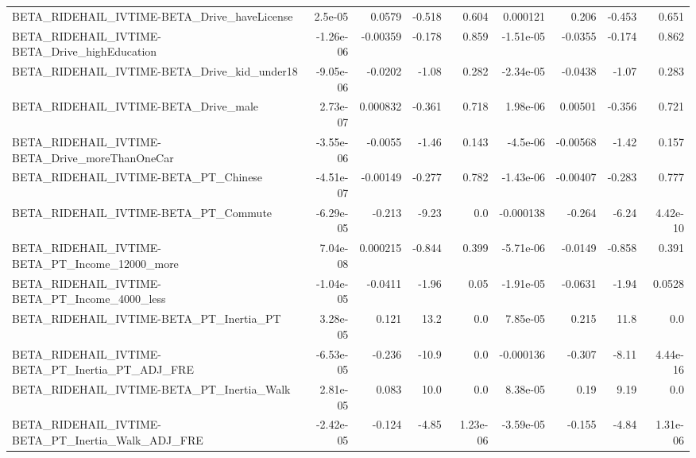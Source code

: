 \begin{tabular}{lrrrrrrrr}
BETA\_RIDEHAIL\_IVTIME-BETA\_Drive\_haveLicense        &     2.5e-05 &       0.0579 &   -0.518 &    0.604 &   0.000121 &       0.206 &       -0.453 &         0.651 \\
BETA\_RIDEHAIL\_IVTIME-BETA\_Drive\_highEducation      &   -1.26e-06 &     -0.00359 &   -0.178 &    0.859 &  -1.51e-05 &     -0.0355 &       -0.174 &         0.862 \\
BETA\_RIDEHAIL\_IVTIME-BETA\_Drive\_kid\_under18        &   -9.05e-06 &      -0.0202 &    -1.08 &    0.282 &  -2.34e-05 &     -0.0438 &        -1.07 &         0.283 \\
BETA\_RIDEHAIL\_IVTIME-BETA\_Drive\_male               &    2.73e-07 &     0.000832 &   -0.361 &    0.718 &   1.98e-06 &     0.00501 &       -0.356 &         0.721 \\
BETA\_RIDEHAIL\_IVTIME-BETA\_Drive\_moreThanOneCar     &   -3.55e-06 &      -0.0055 &    -1.46 &    0.143 &   -4.5e-06 &    -0.00568 &        -1.42 &         0.157 \\
BETA\_RIDEHAIL\_IVTIME-BETA\_PT\_Chinese               &   -4.51e-07 &     -0.00149 &   -0.277 &    0.782 &  -1.43e-06 &    -0.00407 &       -0.283 &         0.777 \\
BETA\_RIDEHAIL\_IVTIME-BETA\_PT\_Commute               &   -6.29e-05 &       -0.213 &    -9.23 &      0.0 &  -0.000138 &      -0.264 &        -6.24 &      4.42e-10 \\
BETA\_RIDEHAIL\_IVTIME-BETA\_PT\_Income\_12000\_more     &    7.04e-08 &     0.000215 &   -0.844 &    0.399 &  -5.71e-06 &     -0.0149 &       -0.858 &         0.391 \\
BETA\_RIDEHAIL\_IVTIME-BETA\_PT\_Income\_4000\_less      &   -1.04e-05 &      -0.0411 &    -1.96 &     0.05 &  -1.91e-05 &     -0.0631 &        -1.94 &        0.0528 \\
BETA\_RIDEHAIL\_IVTIME-BETA\_PT\_Inertia\_PT            &    3.28e-05 &        0.121 &     13.2 &      0.0 &   7.85e-05 &       0.215 &         11.8 &           0.0 \\
BETA\_RIDEHAIL\_IVTIME-BETA\_PT\_Inertia\_PT\_ADJ\_FRE    &   -6.53e-05 &       -0.236 &    -10.9 &      0.0 &  -0.000136 &      -0.307 &        -8.11 &      4.44e-16 \\
BETA\_RIDEHAIL\_IVTIME-BETA\_PT\_Inertia\_Walk          &    2.81e-05 &        0.083 &     10.0 &      0.0 &   8.38e-05 &        0.19 &         9.19 &           0.0 \\
BETA\_RIDEHAIL\_IVTIME-BETA\_PT\_Inertia\_Walk\_ADJ\_FRE  &   -2.42e-05 &       -0.124 &    -4.85 & 1.23e-06 &  -3.59e-05 &      -0.155 &        -4.84 &      1.31e-06 \\

\end{tabular}
